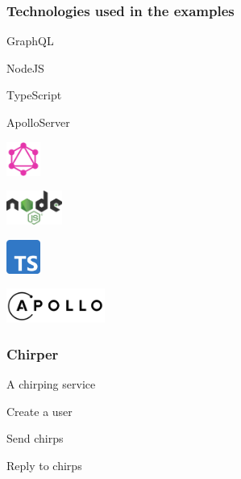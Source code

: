 \documentclass{beamer}
\begin{document}
\begin{frame}
  \frametitle{Technologies used in the examples}
  \begin{minipage}{0.4\linewidth}
    \begin{flushright}
      GraphQL
      
    \vspace{2em}
    NodeJS
    
    \vspace{2em}
    TypeScript
    
    \vspace{2em}
    ApolloServer
    \end{flushright}
  \end{minipage}
  \begin{minipage}{0.45\linewidth}
    \begin{center}
      \includegraphics[height=3em]{GraphQL}

      \includegraphics[height=3em]{NodeJS}
    
      \includegraphics[height=3em]{TypeScript}
    
      \includegraphics[height=3em]{ApolloServer}
    \end{center}
  \end{minipage}
\end{frame}


\begin{frame}
  \frametitle{Chirper}
  
  A chirping service

  \vspace{1em}
  Create a user

  \vspace{1em}
  Send chirps

  \vspace{1em}
  Reply to chirps
\end{frame}
\end{document}
